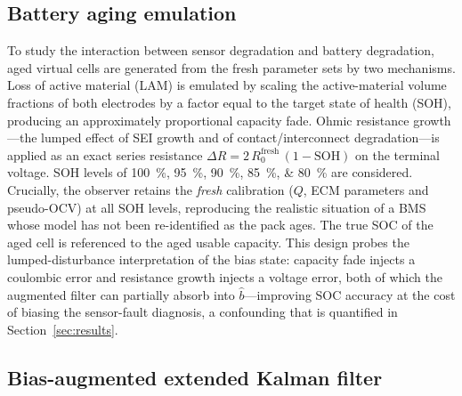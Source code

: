 \documentclass[11pt,a4paper]{article}
\begin{document}
\subsection{Battery aging emulation}
\label{sec:aging}

To study the interaction between sensor degradation and battery
degradation, aged virtual cells are generated from the fresh parameter
sets by two mechanisms. Loss of active material (LAM) is emulated by
scaling the active-material volume fractions of both electrodes by a
factor equal to the target state of health (SOH), producing an
approximately proportional capacity fade. Ohmic resistance growth---the
lumped effect of SEI growth and of contact/interconnect degradation---is
applied as an exact series resistance
$\Delta R = 2\,R_0^{\mathrm{fresh}}\,(1 - \mathrm{SOH})$
on the terminal voltage. SOH levels of \SIlist{100;95;90;85;80}{\percent}
are considered. Crucially, the observer retains the \emph{fresh}
calibration ($Q$, ECM parameters and pseudo-OCV) at all SOH levels,
reproducing the realistic situation of a BMS whose model has not been
re-identified as the pack ages. The true SOC of the aged cell is
referenced to the aged usable capacity. This design probes the
lumped-disturbance interpretation of the bias state: capacity fade injects
a coulombic error and resistance growth injects a voltage error, both of
which the augmented filter can partially absorb into $\hat b$---improving
SOC accuracy at the cost of biasing the sensor-fault diagnosis, a
confounding that is quantified in Section~\ref{sec:results}.

\subsection{Bias-augmented extended Kalman filter}
\label{sec:ekf}
\end{document}
